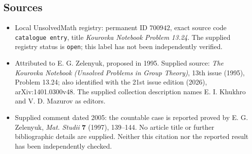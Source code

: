 \documentclass[11pt]{article}
\begin{document}
\subsection{Sources}
\begin{itemize}
\item Local UnsolvedMath registry: permanent ID \(700942\), exact source code \texttt{catalogue entry}, title \emph{Kourovka Notebook Problem 13.24}. The supplied registry status is \texttt{open}; this label has not been independently verified.
\item Attributed to E. G. Zelenyuk, proposed in 1995. Supplied source: \emph{The Kourovka Notebook (Unsolved Problems in Group Theory)}, 13th issue (1995), Problem 13.24; also identified with the 21st issue edition (2026), arXiv:1401.0300v48. The supplied collection description names E. I. Khukhro and V. D. Mazurov as editors.
\item Supplied comment dated 2005: the countable case is reported proved by E. G. Zelenyuk, \emph{Mat. Studii} \textbf{7} (1997), 139--144. No article title or further bibliographic details are supplied. Neither this citation nor the reported result has been independently checked.
\end{itemize}
\end{document}
